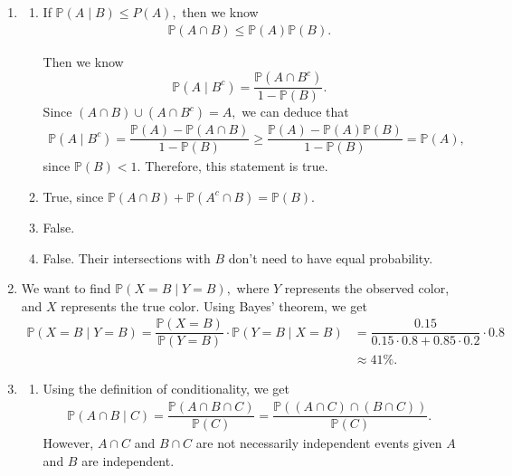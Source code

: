 \documentclass[12pt]{article}
\begin{document}
\begin{enumerate}
  \item
    \begin{enumerate}
      \item If $\mathbb P(A \mid B) \leq P(A),$ then we know
        \begin{align*}
          \mathbb P(A \cap B) \leq \mathbb P(A) \mathbb P(B).
        \end{align*}

        Then we know $$\mathbb P(A \mid B^c) = \dfrac{\mathbb P(A
        \cap B^c)}{1 - \mathbb P(B)}.$$
        Since $(A \cap B) \cup (A \cap B^c) = A,$ we can deduce that
        \begin{align*}
          \mathbb P(A \mid B^c) = \dfrac{\mathbb P(A) - \mathbb P(A
          \cap B)}{1 - \mathbb P(B)} \geq \dfrac{\mathbb P(A) -
          \mathbb P(A) \mathbb P(B)}{1 - \mathbb P(B)} = \mathbb P(A),
        \end{align*}
        since $\mathbb P(B) < 1.$ Therefore, this statement is true.

      \item True, since $\mathbb P(A \cap B) + \mathbb P(A^c \cap B)
        = \mathbb P(B).$

      \item False.

      \item False. Their intersections with $B$ don't need to have
        equal probability.
    \end{enumerate}

  \item We want to find $\mathbb P(X = B \mid Y = B),$ where $Y$
    represents the observed color, and $X$ represents the true color.
    Using Bayes' theorem, we get
    \begin{align*}
      \mathbb P(X = B \mid Y = B)  = \dfrac{\mathbb P(X = B)}{\mathbb
      P(Y = B)} \cdot \mathbb P(Y = B \mid X = B) &=
      \dfrac{0.15}{0.15 \cdot 0.8 + 0.85 \cdot 0.2} \cdot 0.8 \\
      &\approx 41\%.
    \end{align*}

  \item
    \begin{enumerate}
      \item Using the definition of conditionality, we get
        \begin{align*}
          \mathbb P(A \cap B \mid  C) = \dfrac{\mathbb P(A \cap B
          \cap C)}{\mathbb P(C)} = \dfrac{\mathbb P((A \cap C) \cap
          (B \cap C))}{\mathbb P(C)}.
        \end{align*}
        However, $A \cap C$ and $B \cap C$ are not necessarily
        independent events given $A$ and $B$ are independent.


\end{enumerate}
\end{enumerate}
\end{document}
